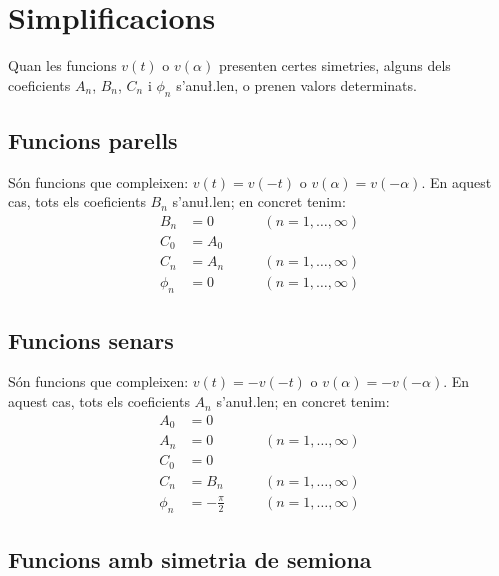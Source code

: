 \section{Simplificacions}

Quan les funcions $v(t)$ o $v(\alpha)$ presenten certes simetries,
alguns dels coeficients $A_n$, $B_n$, $C_n$ i $\phi_n$ s'anu{\l.l}en, o
prenen valors determinats.

\subsection{Funcions parells}

S\'{o}n funcions que compleixen: $v(t) = v(-t)$ o $v(\alpha) =
v(-\alpha)$. En aquest cas,  tots els coeficients $B_n$ s'anu{\l.l}en;
en concret tenim:
\begin{subequations}
\begin{alignat}{2}
    B_n &= 0       &\qquad (n = 1,\ldots,\infty)\\[0.5ex]
    C_0 &= A_0 \\[0.5ex]
    C_n &= A_n     &\qquad (n = 1,\ldots,\infty)\\[0.5ex]
    \phi_n &= 0 &\qquad (n = 1,\ldots,\infty)
\end{alignat}
\end{subequations}

\break
\subsection{Funcions senars}

S\'{o}n funcions que compleixen: $v(t) = -v(-t)$ o $v(\alpha) =
-v(-\alpha)$. En aquest cas,  tots els coeficients $A_n$ s'anu{\l.l}en;
en concret tenim:
\begin{subequations}
\begin{alignat}{2}
    A_0 &= 0       & \\[0.5ex]
    A_n &= 0       &\qquad (n = 1,\ldots,\infty)\\[0.5ex]
    C_0 &= 0    \\[0.5ex]
    C_n &= B_n     &\qquad (n = 1,\ldots,\infty)\\[0.5ex]
    \phi_n &= -\frac{\pi}{2} &\qquad (n = 1,\ldots,\infty)
\end{alignat}
\end{subequations}

\subsection{Funcions amb simetria de semiona}

